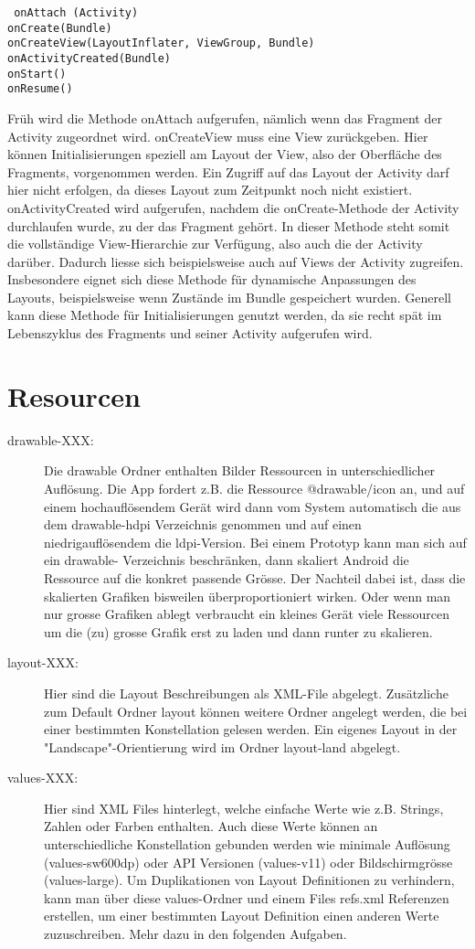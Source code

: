 \documentclass[a4paper,10pt,titlepage=false]{scrreprt}
\begin{document}
\begin{verbatim}
 onAttach (Activity)
onCreate(Bundle)
onCreateView(LayoutInflater, ViewGroup, Bundle)
onActivityCreated(Bundle)
onStart()
onResume()
\end{verbatim}

Früh wird die Methode onAttach aufgerufen, nämlich wenn das Fragment der Activity zugeordnet
wird.
onCreateView muss eine View zurückgeben. Hier können Initialisierungen speziell am Layout der
View, also der Oberfläche des Fragments, vorgenommen werden. Ein Zugriff auf das Layout der
Activity darf hier nicht erfolgen, da dieses Layout zum Zeitpunkt noch nicht existiert.
onActivityCreated wird aufgerufen, nachdem die onCreate-Methode der Activity durchlaufen
wurde, zu der das Fragment gehört. In dieser Methode steht somit die vollständige View-Hierarchie
zur Verfügung, also auch die der Activity darüber. Dadurch liesse sich beispielsweise auch auf
Views der Activity zugreifen. Insbesondere eignet sich diese Methode für dynamische Anpassungen
des Layouts, beispielsweise wenn Zustände im Bundle gespeichert wurden. Generell kann diese
Methode für Initialisierungen genutzt werden, da sie recht spät im Lebenszyklus des Fragments und
seiner Activity aufgerufen wird.

\section{Resourcen}
\begin{description}


\item[drawable-XXX:] Die drawable Ordner enthalten Bilder Ressourcen in unterschiedlicher Auflösung.
Die App fordert z.B. die Ressource @drawable/icon an, und auf einem hochauflösendem Gerät
wird dann vom System automatisch die aus dem drawable-hdpi Verzeichnis genommen und auf
einen niedrigauflösendem die ldpi-Version. Bei einem Prototyp kann man sich auf ein drawable-
Verzeichnis beschränken, dann skaliert Android die Ressource auf die konkret passende Grösse.
Der Nachteil dabei ist, dass die skalierten Grafiken bisweilen überproportioniert wirken. Oder wenn
man nur grosse Grafiken ablegt verbraucht ein kleines Gerät viele Ressourcen um die (zu) grosse
Grafik erst zu laden und dann runter zu skalieren.
\item[layout-XXX:] Hier sind die Layout Beschreibungen als XML-File abgelegt. Zusätzliche zum Default
Ordner layout können weitere Ordner angelegt werden, die bei einer bestimmten Konstellation
gelesen werden. Ein eigenes Layout in der "Landscape"-Orientierung wird im Ordner layout-land
abgelegt.
\item[values-XXX:] Hier sind XML Files hinterlegt, welche einfache Werte wie z.B. Strings, Zahlen oder
Farben enthalten. Auch diese Werte können an unterschiedliche Konstellation gebunden werden wie
minimale Auflösung (values-sw600dp) oder API Versionen (values-v11) oder Bildschirmgrösse
(values-large). Um Duplikationen von Layout Definitionen zu verhindern, kann man über diese
values-Ordner und einem Files refs.xml Referenzen erstellen, um einer bestimmten Layout
Definition einen anderen Werte zuzuschreiben. Mehr dazu in den folgenden Aufgaben.
\end{description}
\end{document}
